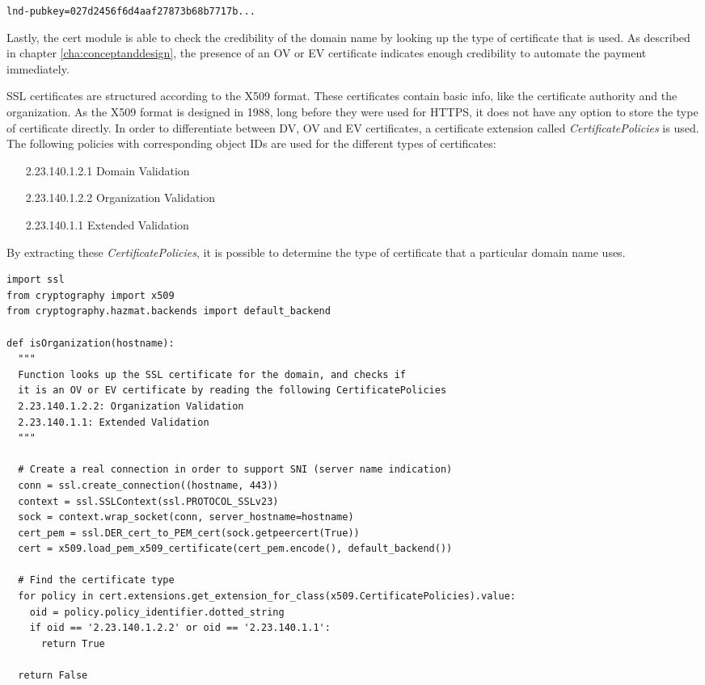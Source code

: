 \texttt{lnd-pubkey=027d2456f6d4aaf27873b68b7717b...}

Lastly, the cert module is able to check the credibility of the domain name by looking up the type of certificate that is used. As described in chapter \ref{cha:conceptanddesign}, the presence of an OV or EV certificate indicates enough credibility to automate the payment immediately. 

SSL certificates are structured according to the X509 format. These certificates contain basic info, like the certificate authority and the organization. As the X509 format is designed in 1988, long before they were used for HTTPS, it does not have any option to store the type of certificate directly. In order to differentiate between DV, OV and EV certificates, a certificate extension called \textit{CertificatePolicies} is used. The following policies with corresponding object IDs are used for the different types of certificates:

\begin{enumerate}[leftmargin=8em]
  \item[2.23.140.1.2.1] Domain Validation
  \item[2.23.140.1.2.2] Organization Validation
  \item[2.23.140.1.1] Extended Validation
\end{enumerate}

By extracting these \textit{CertificatePolicies}, it is possible to determine the type of certificate that a particular domain name uses. 


\lstset{language=Python}
\lstset{frame=lines}
\lstset{basicstyle=\footnotesize}
\begin{lstlisting}
import ssl
from cryptography import x509
from cryptography.hazmat.backends import default_backend

def isOrganization(hostname):
  """
  Function looks up the SSL certificate for the domain, and checks if 
  it is an OV or EV certificate by reading the following CertificatePolicies
  2.23.140.1.2.2: Organization Validation
  2.23.140.1.1: Extended Validation 
  """

  # Create a real connection in order to support SNI (server name indication)
  conn = ssl.create_connection((hostname, 443))
  context = ssl.SSLContext(ssl.PROTOCOL_SSLv23)
  sock = context.wrap_socket(conn, server_hostname=hostname)
  cert_pem = ssl.DER_cert_to_PEM_cert(sock.getpeercert(True))
  cert = x509.load_pem_x509_certificate(cert_pem.encode(), default_backend())
  
  # Find the certificate type
  for policy in cert.extensions.get_extension_for_class(x509.CertificatePolicies).value:
    oid = policy.policy_identifier.dotted_string
    if oid == '2.23.140.1.2.2' or oid == '2.23.140.1.1':
      return True

  return False
\end{lstlisting}

